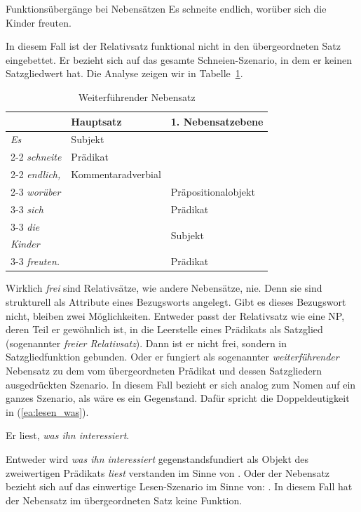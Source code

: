 \begin{Exkurs}{Funktionsübergänge bei Nebensätzen}
\ea \label{ea:regnen_worüber} Es schneite endlich, worüber sich die Kinder freuten.
\z 

In diesem Fall ist der Relativsatz funktional nicht in den übergeordneten Satz eingebettet. Er bezieht sich auf das gesamte Schneien-Szenario, in dem er keinen Satzgliedwert hat. Die Analyse zeigen wir in Tabelle~\ref{tab:weiterführenderNeSa}.

\begin{table}
  \centering
  \begin{tabular}{l|l|l}
     &  Hauptsatz  &  1. Nebensatzebene \\
    \hline
    \textit{Es} & Subjekt &  \\ \cline{2-2}
    \textit{schneite} & Prädikat & \\ \cline{2-2}
    \textit{endlich,} & Kommentaradverbial \\ \cline{2-3}
    \textit{worüber} & & Präpositionalobjekt \\ \cline{3-3}
    \textit{sich} &  & Prädikat  \\ \cline{3-3}   
    \textit{die} & & \multirow{2}{*}{Subjekt} \\ 
    \textit{Kinder} & & \\ \cline{3-3} 
    \textit{freuten.} & & Prädikat \\
  \hline 
  \end{tabular}
  \caption{Weiterführender Nebensatz}
  \label{tab:weiterführenderNeSa}
\end{table}

Wirklich \textit{frei} sind Relativsätze, wie andere Nebensätze, nie. Denn sie sind strukturell als Attribute eines Bezugsworts angelegt. Gibt es dieses Bezugswort nicht, bleiben zwei Möglichkeiten. Entweder passt der Relativsatz wie eine NP, deren Teil er gewöhnlich ist, in die Leerstelle eines Prädikats als Satzglied (sogenannter \textit{freier Relativsatz}). Dann ist er nicht frei, sondern in Satzgliedfunktion gebunden. Oder er fungiert als sogenannter \textit{weiterführender} Nebensatz zu dem vom übergeordneten Prädikat und dessen Satzgliedern ausgedrückten Szenario. In diesem Fall bezieht er sich analog zum Nomen auf ein ganzes Szenario, als wäre es ein Gegenstand. Dafür spricht die Doppeldeutigkeit in (\ref{ea:lesen_was}). 

\ea \label{ea:lesen_was} Er liest, \textit{was ihn interessiert}.
\z 

Entweder wird \textit{was ihn interessiert} gegenstandsfundiert als Objekt des zweiwertigen Prädikats \textit{liest} verstanden im Sinne von . Oder der Nebensatz bezieht sich auf das einwertige Lesen-Szenario im Sinne von: . In diesem Fall hat der Nebensatz im übergeordneten Satz keine Funktion.


\end{Exkurs}
